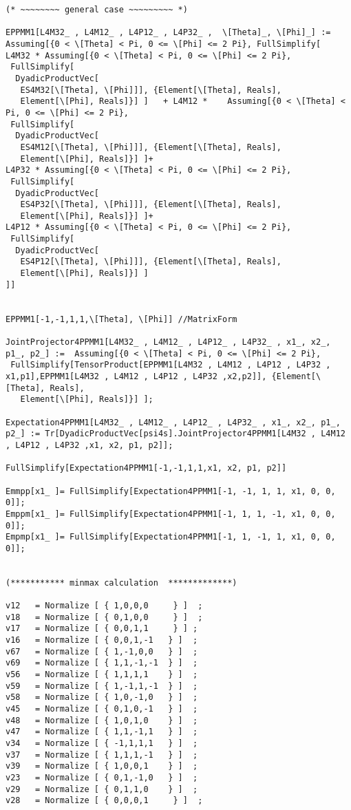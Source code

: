 \documentclass[%
 showpacs,
 showkeys,
 preprintnumbers,
 amsmath,amssymb,
 aps,
  pra,
  longbibliography,
 floatfix,
 ]{revtex4-1}
\begin{document}
{\begin{lstlisting}[backgroundcolor=\color{yellow!10},framerule=0pt,breaklines=true, frame=tb]
(* ~~~~~~~~ general case ~~~~~~~~~ *)

EPPMM1[L4M32_ , L4M12_ , L4P12_ , L4P32_ ,  \[Theta]_, \[Phi]_] :=   Assuming[{0 < \[Theta] < Pi, 0 <= \[Phi] <= 2 Pi}, FullSimplify[
L4M32 * Assuming[{0 < \[Theta] < Pi, 0 <= \[Phi] <= 2 Pi},
 FullSimplify[
  DyadicProductVec[
   ES4M32[\[Theta], \[Phi]]], {Element[\[Theta], Reals],
   Element[\[Phi], Reals]}] ]   + L4M12 *    Assuming[{0 < \[Theta] < Pi, 0 <= \[Phi] <= 2 Pi},
 FullSimplify[
  DyadicProductVec[
   ES4M12[\[Theta], \[Phi]]], {Element[\[Theta], Reals],
   Element[\[Phi], Reals]}] ]+
L4P32 * Assuming[{0 < \[Theta] < Pi, 0 <= \[Phi] <= 2 Pi},
 FullSimplify[
  DyadicProductVec[
   ES4P32[\[Theta], \[Phi]]], {Element[\[Theta], Reals],
   Element[\[Phi], Reals]}] ]+
L4P12 * Assuming[{0 < \[Theta] < Pi, 0 <= \[Phi] <= 2 Pi},
 FullSimplify[
  DyadicProductVec[
   ES4P12[\[Theta], \[Phi]]], {Element[\[Theta], Reals],
   Element[\[Phi], Reals]}] ]
]]


EPPMM1[-1,-1,1,1,\[Theta], \[Phi]] //MatrixForm

JointProjector4PPMM1[L4M32_ , L4M12_ , L4P12_ , L4P32_ , x1_, x2_, p1_, p2_] :=  Assuming[{0 < \[Theta] < Pi, 0 <= \[Phi] <= 2 Pi},
 FullSimplify[TensorProduct[EPPMM1[L4M32 , L4M12 , L4P12 , L4P32 , x1,p1],EPPMM1[L4M32 , L4M12 , L4P12 , L4P32 ,x2,p2]], {Element[\[Theta], Reals],
   Element[\[Phi], Reals]}] ];

Expectation4PPMM1[L4M32_ , L4M12_ , L4P12_ , L4P32_ , x1_, x2_, p1_, p2_] := Tr[DyadicProductVec[psi4s].JointProjector4PPMM1[L4M32 , L4M12 , L4P12 , L4P32 ,x1, x2, p1, p2]];

FullSimplify[Expectation4PPMM1[-1,-1,1,1,x1, x2, p1, p2]]

Emmpp[x1_ ]= FullSimplify[Expectation4PPMM1[-1, -1, 1, 1, x1, 0, 0, 0]];
Emppm[x1_ ]= FullSimplify[Expectation4PPMM1[-1, 1, 1, -1, x1, 0, 0, 0]];
Empmp[x1_ ]= FullSimplify[Expectation4PPMM1[-1, 1, -1, 1, x1, 0, 0, 0]];


(*********** minmax calculation  *************)

v12   = Normalize [ { 1,0,0,0     } ]  ;
v18   = Normalize [ { 0,1,0,0     } ]  ;
v17   = Normalize [ { 0,0,1,1     } ] ;
v16   = Normalize [ { 0,0,1,-1   } ]  ;
v67   = Normalize [ { 1,-1,0,0   } ]  ;
v69   = Normalize [ { 1,1,-1,-1  } ]  ;
v56   = Normalize [ { 1,1,1,1    } ]  ;
v59   = Normalize [ { 1,-1,1,-1  } ]  ;
v58   = Normalize [ { 1,0,-1,0   } ]  ;
v45   = Normalize [ { 0,1,0,-1   } ]  ;
v48   = Normalize [ { 1,0,1,0    } ]  ;
v47   = Normalize [ { 1,1,-1,1   } ]  ;
v34   = Normalize [ { -1,1,1,1   } ]  ;
v37   = Normalize [ { 1,1,1,-1   } ]  ;
v39   = Normalize [ { 1,0,0,1    } ]  ;
v23   = Normalize [ { 0,1,-1,0   } ]  ;
v29   = Normalize [ { 0,1,1,0    } ]  ;
v28   = Normalize [ { 0,0,0,1     } ]  ;


\end{lstlisting}}
\end{document}

